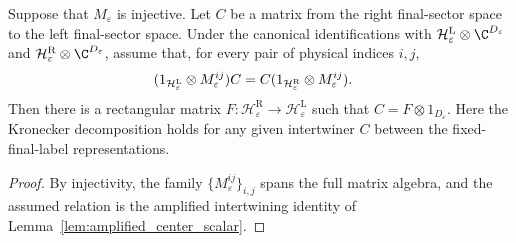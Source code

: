 \begin{lemma}%
    \label{thm:mpdo_injective_fixed_final_intertwiner}
    \leanok
    Suppose that $M_\varepsilon$ is injective. Let $C$ be a matrix from the
    right final-sector space to the left final-sector space. Under
    the canonical identifications with
    $\mathcal H^{\mathrm L}_{\varepsilon}\otimes\C^{D_\varepsilon}$ and
    $\mathcal H^{\mathrm R}_{\varepsilon}\otimes\C^{D_\varepsilon}$, assume
    that, for every pair of physical indices $i,j$,
    \begin{align}
        (1_{\mathcal H^{\mathrm L}_{\varepsilon}}\otimes
        M_\varepsilon^{ij})C
         & =C(1_{\mathcal H^{\mathrm R}_{\varepsilon}}\otimes
        M_\varepsilon^{ij}).
        \notag
    \end{align}
    Then there is a rectangular matrix
    $F:\mathcal H^{\mathrm R}_{\varepsilon}\to
        \mathcal H^{\mathrm L}_{\varepsilon}$ such that
    $C=F\otimes 1_{D_\varepsilon}$.
    Here the Kronecker decomposition holds for any given intertwiner $C$ between
    the fixed-final-label representations.
\end{lemma}
\begin{proof}\leanok
    By injectivity, the family $\{M_\varepsilon^{ij}\}_{i,j}$ spans the full
    matrix algebra, and the assumed relation is the amplified intertwining
    identity of Lemma~\ref{lem:amplified_center_scalar}.
\end{proof}


